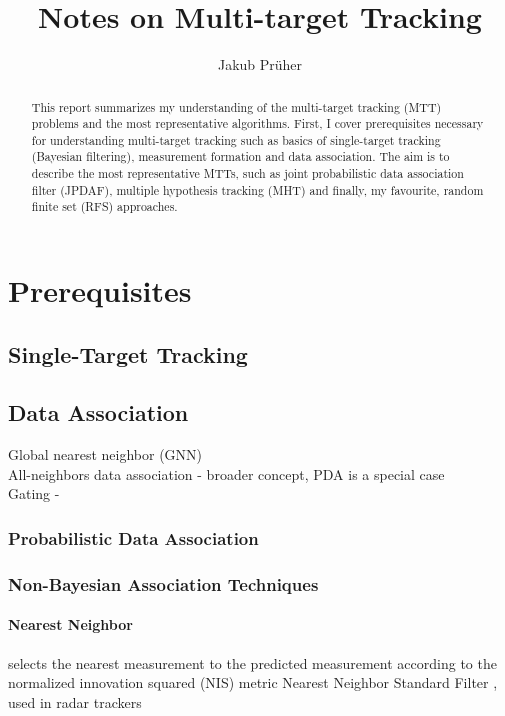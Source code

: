 \documentclass[a4paper,10pt]{scrreprt}
\title{Notes on Multi-target Tracking}
\author{Jakub Prüher}
\theoremstyle{theorem}
\theoremstyle{definition}
\begin{document}
\maketitle
\begin{abstract}
	This report summarizes my understanding of the multi-target tracking (MTT) problems and the most representative algorithms. 
	First, I cover prerequisites necessary for understanding multi-target tracking such as basics of single-target tracking (Bayesian filtering), measurement formation and data association.
	The aim is to describe the most representative MTTs, such as joint probabilistic data association filter (JPDAF), multiple hypothesis tracking (MHT) and finally, my favourite, random finite set (RFS) approaches.
\end{abstract}




\chapter{Prerequisites}\label{ch:prerequisites}
\section{Single-Target Tracking}\label{sec:single-target_tracking}
\section{Data Association}\label{sec:data_association}
Global nearest neighbor (GNN)\\
All-neighbors data association - broader concept, PDA is a special case\\
Gating - 

\subsection{Probabilistic Data Association}
\subsection{Non-Bayesian Association Techniques}
\subsubsection{Nearest Neighbor}
selects the nearest measurement to the predicted measurement according to the normalized innovation squared (NIS) metric
Nearest Neighbor Standard Filter \citep{Bar-Shalom1995}, used in radar trackers
\end{document}
